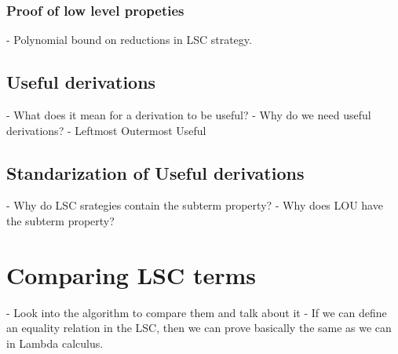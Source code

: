 \documentclass[12pt]{article}
\begin{document}
\subsubsection{Proof of low level propeties}
- Polynomial bound on reductions in LSC strategy.
\subsection{Useful derivations}
- What does it mean for a derivation to be useful?
- Why do we need useful derivations?
- Leftmost Outermost Useful
\subsection{Standarization of Useful derivations}
- Why do LSC srategies contain the subterm property?
- Why does LOU have the subterm property?
\section{Comparing LSC terms}
- Look into the algorithm to compare them and talk about it
- If we can define an equality relation in the LSC, then we can prove basically the same as we can in Lambda calculus.

\printbibliography
\end{document}
